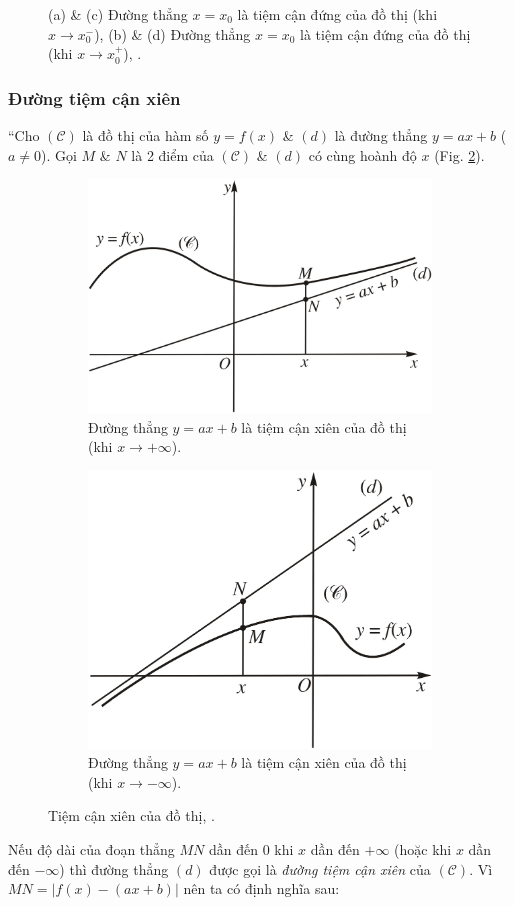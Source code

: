 \documentclass{article}
\numberwithin{equation}{section}
\begin{document}
\begin{figure}[h]
\begin{subfigure}{.5\textwidth}
		\caption{}
	\end{subfigure}
	\caption{(a) \& (c) Đường thẳng $x = x_0$ là tiệm cận đứng của đồ thị (khi $x\to x_0^-$), (b) \& (d) Đường thẳng $x = x_0$ là tiệm cận đứng của đồ thị (khi $x\to x_0^+$), \cite[Hình 1.8, p. 30]{SGK_Toan_12_giai_tich_nang_cao}.}
	\label{fig:tiem_can_dung}
\end{figure}

\subsubsection{Đường tiệm cận xiên}
``Cho $(\mathcal{C})$ là đồ thị của hàm số $y = f(x)$ \& $(d)$ là đường thẳng $y = ax + b$ ($a\ne 0$). Gọi $M$ \& $N$ là 2 điểm của $(\mathcal{C})$ \& $(d)$ có cùng hoành độ $x$ (Fig. \ref{fig:tiem_can_xien}).

\begin{figure}[H]
	\centering
	\begin{subfigure}{.5\textwidth}
		\centering
		\includegraphics[width=.6\linewidth]{tiem_can_xien_a}
		\caption{Đường thẳng $y = ax + b$ là tiệm cận xiên của đồ thị (khi $x\to+\infty$).}
	\end{subfigure}%
	\begin{subfigure}{.5\textwidth}
		\centering
		\includegraphics[width=.5\linewidth]{tiem_can_xien_b}
		\caption{Đường thẳng $y = ax + b$ là tiệm cận xiên của đồ thị (khi $x\to-\infty$).}
	\end{subfigure}
	\caption{Tiệm cận xiên của đồ thị, \cite[Hình 1.11, p. 33]{SGK_Toan_12_giai_tich_nang_cao}.}
	\label{fig:tiem_can_xien}
\end{figure}
Nếu độ dài của đoạn thẳng $MN$ dần đến $0$ khi $x$ dần đến $+\infty$ (hoặc khi $x$ dần đến $-\infty$) thì đường thẳng $(d)$ được gọi là \textit{đường tiệm cận xiên} của $(\mathcal{C})$. Vì $MN = |f(x) - (ax + b)|$ nên ta có định nghĩa sau:
\end{document}
